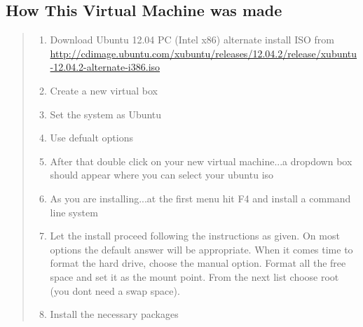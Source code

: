 \documentclass[letterpaper,10pt,english]{sphinxmanual}
\begin{document}
\subsection{How This Virtual Machine was made}
\label{vm:how-this-virtual-machine-was-made}\begin{quote}
\begin{enumerate}
\item {} 
Download Ubuntu 12.04 PC (Intel x86) alternate install ISO from
\url{http://cdimage.ubuntu.com/xubuntu/releases/12.04.2/release/xubuntu-12.04.2-alternate-i386.iso}

\item {} 
Create a new virtual box

\item {} 
Set the system as Ubuntu

\item {} 
Use defualt options

\item {} 
After that double click on your new virtual machine...a dropdown
box should appear where you can select
your ubuntu iso

\item {} 
As you are installing...at the first menu hit F4 and install a
command line system

\item {} 
Let the install proceed following the instructions as given. On most
options the default answer will be appropriate.
When it comes time to format the hard drive, choose the manual option.
Format all the free space and set it as the mount
point. From the next list choose root (you dont need a swap space).

\item {} 
Install the necessary packages


\end{enumerate}
\end{quote}
\end{document}
